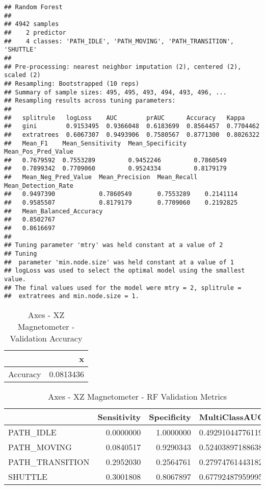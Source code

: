 \documentclass[]{article}
\begin{document}
\begin{verbatim}
## Random Forest 
## 
## 4942 samples
##    2 predictor
##    4 classes: 'PATH_IDLE', 'PATH_MOVING', 'PATH_TRANSITION', 'SHUTTLE' 
## 
## Pre-processing: nearest neighbor imputation (2), centered (2), scaled (2) 
## Resampling: Bootstrapped (10 reps) 
## Summary of sample sizes: 495, 495, 493, 494, 493, 496, ... 
## Resampling results across tuning parameters:
## 
##   splitrule   logLoss    AUC        prAUC      Accuracy   Kappa    
##   gini        0.9153495  0.9366048  0.6183699  0.8564457  0.7704462
##   extratrees  0.6067307  0.9493906  0.7580567  0.8771300  0.8026322
##   Mean_F1    Mean_Sensitivity  Mean_Specificity  Mean_Pos_Pred_Value
##   0.7679592  0.7553289         0.9452246         0.7860549          
##   0.7899342  0.7709060         0.9524334         0.8179179          
##   Mean_Neg_Pred_Value  Mean_Precision  Mean_Recall  Mean_Detection_Rate
##   0.9497390            0.7860549       0.7553289    0.2141114          
##   0.9585507            0.8179179       0.7709060    0.2192825          
##   Mean_Balanced_Accuracy
##   0.8502767             
##   0.8616697             
## 
## Tuning parameter 'mtry' was held constant at a value of 2
## Tuning
##  parameter 'min.node.size' was held constant at a value of 1
## logLoss was used to select the optimal model using the smallest value.
## The final values used for the model were mtry = 2, splitrule =
##  extratrees and min.node.size = 1.
\end{verbatim}

\begin{table}[!h]

\caption{\label{tab:sensor-xz-mag-rf-results}Axes - XZ Magnetometer - Validation Accuracy}
\centering
\begin{tabular}[t]{lr}
\toprule
  & x\\
\midrule
Accuracy & 0.0813436\\
\bottomrule
\end{tabular}
\end{table}

\begin{table}[!h]

\caption{\label{tab:sensor-xz-mag-rf-results}Axes - XZ Magnetometer - RF Validation Metrics}
\centering
\begin{tabular}[t]{lrrl}
\toprule
  & Sensitivity & Specificity & MultiClassAUC\\
\midrule
PATH\_IDLE & 0.0000000 & 1.0000000 & 0.492910447761194\\
PATH\_MOVING & 0.0840517 & 0.9290343 & 0.524038971886384\\
PATH\_TRANSITION & 0.2952030 & 0.2564761 & 0.279747614431828\\
SHUTTLE & 0.3001808 & 0.8067897 & 0.677924879599953\\
\bottomrule
\end{tabular}
\end{table}
\end{document}
